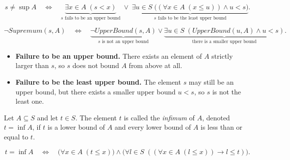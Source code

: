 \begin{remark*}
\[
s \ne \sup A
\quad\Longleftrightarrow\quad
\underbrace{\exists x \in A \; (s < x)}_{\text{$s$ fails to be an upper bound}}
\;\lor\;
\underbrace{\exists u \in S \; \bigl((\forall x \in A \; (x \le u)) \land u < s\bigr)}_{\text{$s$ fails to be the least upper bound}}.
\]
\end{remark*}

\begin{remark*}
\[
\neg Supremum(s,A)
\quad\Longleftrightarrow\quad
\underbrace{\neg UpperBound(s,A)}_{\text{$s$ is not an upper bound}}
\lor
\underbrace{\exists u \in S \; (UpperBound(u,A) \land u < s)}_{\text{there is a smaller upper bound}}.
\]
\end{remark*}

\begin{remark*}\hfill
\begin{itemize}
  \item \textbf{Failure to be an upper bound.} There exists an element of $A$ strictly larger than $s$, so $s$ does not bound $A$ from above at all.
  \item \textbf{Failure to be the least upper bound.} The element $s$ may still be an upper bound, but there exists a smaller upper bound $u < s$, so $s$ is not the least one.
\end{itemize}
\end{remark*}














\begin{tcolorbox}[colback=propbox, colframe=propborder, arc=2pt,
  left=6pt, right=6pt, top=4pt, bottom=4pt,
  title={\small\textbf{Definition (Infimum)}},
  fonttitle=\small\bfseries]
\begin{definition}
\label{def:infimum}
Let $A \subseteq S$ and let $t \in S$. The element $t$ is called the
\emph{infimum} of $A$, denoted $t = \inf A$, if $t$ is a lower bound of $A$
and every lower bound of $A$ is less than or equal to $t$.
\end{definition}
\end{tcolorbox}

\begin{remark*}
\[
t = \inf A
\quad\Longleftrightarrow\quad
\bigl(\forall x \in A \; (t \le x)\bigr)
\land
\bigl(\forall l \in S \; ((\forall x \in A \; (l \le x)) \rightarrow l \le t)\bigr).
\]
\end{remark*}

